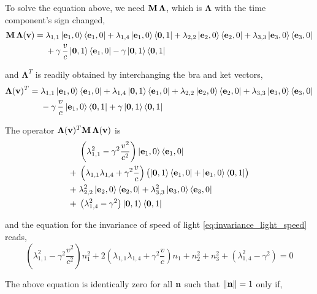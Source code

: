 \documentclass[12pt]{article}
\begin{document}
To solve the equation above, we need $\vb{M}\,\boldsymbol{\Lambda}$, which is
$\boldsymbol{\Lambda}$ with the time component's sign changed,
\[
  \begin{aligned}
    \vb{M}\,\boldsymbol{\Lambda}(\vb{v}) =\;
      &\lambda_{1,1}\ket{\vb{e}_1,0}\bra{\vb{e}_1,0}
      + \lambda_{1,4}\ket{\vb{e}_1,0}\bra{\vb{0},1}
      + \lambda_{2,2}\ket{\vb{e}_2,0}\bra{\vb{e}_2,0}
      + \lambda_{3,3}\ket{\vb{e}_3,0}\bra{\vb{e}_3,0} \\
      &+ \gamma\,\frac{v}{c}\ket{\vb{0},1}\bra{\vb{e}_1,0}
      - \gamma\ket{\vb{0},1}\bra{\vb{0},1}
  \end{aligned}
\]

and $\boldsymbol{\Lambda}^T$ is readily obtained by interchanging the bra and ket vectors,
\[
  \begin{aligned}
    \boldsymbol{\Lambda}(\vb{v})^T =\;
      &\lambda_{1,1}\ket{\vb{e}_1,0}\bra{\vb{e}_1,0}
      + \lambda_{1,4}\ket{\vb{0},1}\bra{\vb{e}_1,0}
      + \lambda_{2,2}\ket{\vb{e}_2,0}\bra{\vb{e}_2,0}
      + \lambda_{3,3}\ket{\vb{e}_3,0}\bra{\vb{e}_3,0} \\
      &- \gamma\,\frac{v}{c}\ket{\vb{e}_1,0}\bra{\vb{0},1}
      + \gamma\ket{\vb{0},1}\bra{\vb{0},1}
  \end{aligned}
\]



The operator $\boldsymbol{\Lambda}(\vb{v})^T\vb{M}\,\boldsymbol{\Lambda}(\vb{v})$ is
\[
  \begin{aligned}
    &\left(\lambda_{1,1}^2 - \gamma^2\frac{v^2}{c^2}\right)\ket{\vb{e}_1,0}\bra{\vb{e}_1,0} \\
    +\;&\left(\lambda_{1,1}\lambda_{1,4} + \gamma^2\frac{v}{c}\right)
      \bigl(\ket{\vb{0},1}\bra{\vb{e}_1,0} + \ket{\vb{e}_1,0}\bra{\vb{0},1}\bigr) \\
    +\;&\lambda_{2,2}^2\ket{\vb{e}_2,0}\bra{\vb{e}_2,0}
      + \lambda_{3,3}^2\ket{\vb{e}_3,0}\bra{\vb{e}_3,0} \\
    +\;&\left(\lambda_{1,4}^2 - \gamma^2\right)\ket{\vb{0},1}\bra{\vb{0},1}
  \end{aligned}
\]

and the equation for the invariance of speed of light \eqref{eq:invariance_light_speed} reads,
\[
  \left(\lambda_{1,1}^2 - \gamma^2\frac{v^2}{c^2}\right)n_1^2
  + 2\left(\lambda_{1,1}\lambda_{1,4} + \gamma^2\frac{v}{c}\right)n_1
  + n_2^2 + n_3^2
  + \left(\lambda_{1,4}^2 - \gamma^2\right) = 0
\]

The above equation is identically zero for all $\vb{n}$ such that $\|\vb{n}\| = 1$ only if,
\end{document}
